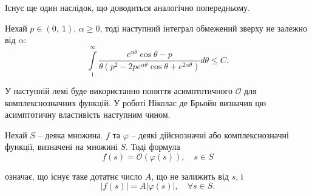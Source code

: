 Існує ще один наслідок, що доводиться аналогічно попередньому. 
\begin{corollary}
	\label{lem:trig_exp_bound}
	Нехай $p \in (0,~1)$, $\alpha \geq 0$, тоді наступний інтеграл обмежений зверху не залежно від $\alpha$:
	\begin{equation*}
	\int\limits_{1}^{\infty} \frac{e^{\alpha\theta}\cos \theta - p}{\theta(p^2 - 2pe^{\alpha\theta}\cos\theta + e^{2\alpha\theta})} d \theta \leq C.
	\end{equation*}
\end{corollary}

У наступній лемі буде використанно поняття асимптотичного $\mathcal{O}$ для комплекснозначних функцій. У роботі \cite{de1970asymptotic} Ніколас де Брьойн визначив цю асимптотичну властивість наступним чином.
\begin{defin}
Нехай $S$ -- деяка множина. $f$ та $\varphi$ -- деякі дійснозначні або комплекснозначні функції, визначені на множині $S$. Тоді формула
\begin{equation*}
f(s) = \mathcal{O}(\varphi(s)), \quad s \in S
\end{equation*}

означає, що існує таке дотатнє число $A$, що не залижить від $s$, і
\begin{equation*}
|f(s)| = A |\varphi(s)|, \quad \forall s \in S.
\end{equation*}
\end{defin}

